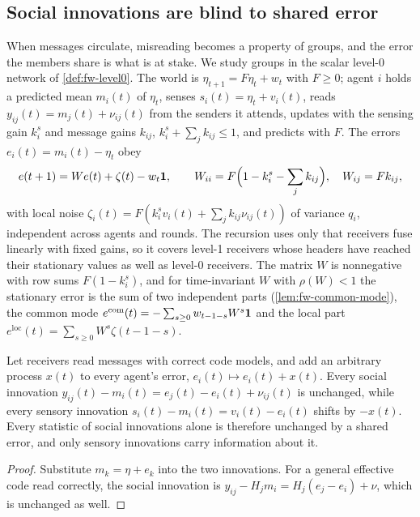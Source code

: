 \subsection{Social innovations are blind to shared error}\label{sec:mis-blind}

When messages circulate, misreading becomes a property of groups, and the error the members share is what is at stake. We study groups in the scalar level-0 network of \cref{def:fw-level0}. The world is $\eta_{t+1}=F\eta_t+w_t$ with $F\ge0$; agent $i$ holds a predicted mean $m_i(t)$ of $\eta_t$, senses $s_i(t)=\eta_t+v_i(t)$, reads $y_{ij}(t)=m_j(t)+\nu_{ij}(t)$ from the senders it attends, updates with the sensing gain $k^s_i$ and message gains $k_{ij}$, $k^s_i+\sum_jk_{ij}\le1$, and predicts with $F$. The errors $e_i(t)=m_i(t)-\eta_t$ obey
\begin{equation}\label{eq:mis-level0}
e(t+1)=We(t)+\zeta(t)-w_t\mathbf{1},\qquad W_{ii}=F\Bigl(1-k^s_i-\sum_jk_{ij}\Bigr),\quad W_{ij}=Fk_{ij},
\end{equation}
with local noise $\zeta_i(t)=F(k^s_iv_i(t)+\sum_jk_{ij}\nu_{ij}(t))$ of variance $q_i$, independent across agents and rounds. The recursion uses only that receivers fuse linearly with fixed gains, so it covers level-1 receivers whose headers have reached their stationary values as well as level-0 receivers. The matrix $W$ is nonnegative with row sums $F(1-k^s_i)$, and for time-invariant $W$ with $\rho(W)<1$ the stationary error is the sum of two independent parts (\cref{lem:fw-common-mode}), the common mode $e^{\mathrm{com}}(t)=-\sum_{s\ge0}w_{t-1-s}W^s\mathbf{1}$ and the local part $e^{\mathrm{loc}}(t)=\sum_{s\ge0}W^s\zeta(t-1-s)$.

\begin{lemma}\label{lem:mis-social-blind}
Let receivers read messages with correct code models, and add an arbitrary process $x(t)$ to every agent's error, $e_i(t)\mapsto e_i(t)+x(t)$. Every social innovation $y_{ij}(t)-m_i(t)=e_j(t)-e_i(t)+\nu_{ij}(t)$ is unchanged, while every sensory innovation $s_i(t)-m_i(t)=v_i(t)-e_i(t)$ shifts by $-x(t)$. Every statistic of social innovations alone is therefore unchanged by a shared error, and only sensory innovations carry information about it.
\end{lemma}
\begin{proof}
Substitute $m_k=\eta+e_k$ into the two innovations. For a general effective code read correctly, the social innovation is $y_{ij}-H_jm_i=H_j(e_j-e_i)+\nu$, which is unchanged as well.
\end{proof}

